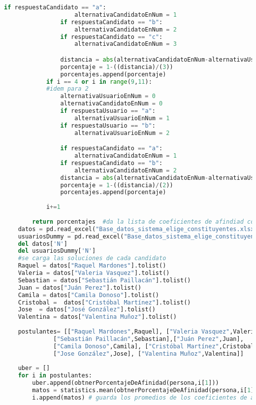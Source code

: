 \documentclass[a4paper]{article}
\begin{document}
\begin{lstlisting}[language=Python]
                if respuestaCandidato == "a":
                    alternativaCandidatoEnNum = 1
                if respuestaCandidato == "b":
                    alternativaCandidatoEnNum = 2
                if respuestaCandidato == "c":
                    alternativaCandidatoEnNum = 3

                distancia = abs(alternativaCandidatoEnNum-alternativaUsuarioEnNum)
                porcentaje = 1-((distancia)/(3))
                porcentajes.append(porcentaje)
            if i == 4 or i in range(9,11):
            #idem para 2
                alternativaUsuarioEnNum = 0
                alternativaCandidatoEnNum = 0
                if respuestaUsuario == "a":
                    alternativaUsuarioEnNum = 1
                if respuestaUsuario == "b":
                    alternativaUsuarioEnNum = 2

                if respuestaCandidato == "a":
                    alternativaCandidatoEnNum = 1
                if respuestaCandidato == "b":
                    alternativaCandidatoEnNum = 2
                distancia = abs(alternativaCandidatoEnNum-alternativaUsuarioEnNum)
                porcentaje = 1-((distancia)/(2))
                porcentajes.append(porcentaje)   
            
            i+=1
        
        return porcentajes  #da la lista de coeficientes de afindiad con un candidato
    datos = pd.read_excel("Base_datos_sistema_elige_constituyentes.xlsx")
    usuariosDummy = pd.read_excel("Base_datos_sistema_elige_constituyentes.xlsx", sheet_name = "Respuestas usuariosas")
    del datos['N']
    del usuariosDummy['N']
    #se carga las soluciones de cada candidato
    Raquel = datos["Raquel Mardones"].tolist() 
    Valeria = datos["Valeria Vasquez"].tolist()
    Sebastian = datos["Sebastián Paillacán"].tolist()
    Juan = datos["Juán Perez"].tolist()
    Camila = datos["Camila Donoso"].tolist()
    Cristobal =  datos["Cristóbal Martínez"].tolist()
    Jose  = datos["José González"].tolist()
    Valentina = datos["Valentina Muñoz"].tolist()
    
    postulantes= [["Raquel Mardones",Raquel], ["Valeria Vasquez",Valeria], 
              ["Sebastián Paillacán",Sebastian],["Juán Perez",Juan],
              ["Camila Donoso",Camila], ["Cristóbal Martínez",Cristobal], 
              ["Jose González",Jose], ["Valentina Muñoz",Valentina]]
    
    uber = [] 
    for i in postulantes:
        uber.append(obtnerPorcentajeDeAfinidad(persona,i[1]))
        matos = statistics.mean(obtnerPorcentajeDeAfinidad(persona,i[1]))
        i.append(matos) # guarda los promedios de los coeficientes de afinidad por pregunta de cada candidato con el usuario


\end{lstlisting}
\end{document}
